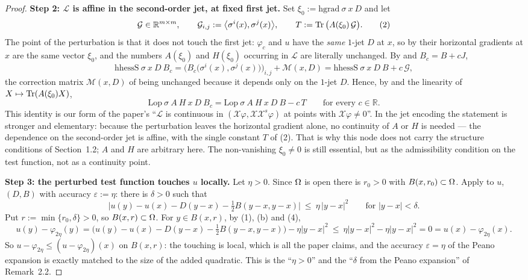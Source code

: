 \begin{proof}
\medskip\noindent\textbf{Step 2: $\mathcal L$ is affine in the second-order jet, at fixed
first jet.} Set $\xi_0:=\mathrm{hgrad}\ \sigma\ x\ D$ and let
\[
 \mathcal G\in\mathbb R^{m\times m},\qquad
 \mathcal G_{i,j}:=\big\langle\sigma^{i}(x),\sigma^{j}(x)\big\rangle,
 \qquad T:=\operatorname{Tr}\big(A(\xi_0)\,\mathcal G\big). \tag{2}
\]
The point of the perturbation is that it does not touch the first jet: $\varphi_c$ and $u$
have the \emph{same} $1$-jet $D$ at $x$, so by  their horizontal gradients
at $x$ are the same vector $\xi_0$, and the numbers $A(\xi_0)$ and $H(\xi_0)$ occurring in
$\mathcal L$ are literally unchanged. By  and $B_c=B+cJ$,
\[
 \mathrm{hhessS}\ \sigma\ x\ D\ B_c
 =\Big(B_c\big(\sigma^{i}(x),\sigma^{j}(x)\big)\Big)_{i,j}+\mathcal M(x,D)
 =\mathrm{hhessS}\ \sigma\ x\ D\ B+c\,\mathcal G ,
\]
the correction matrix $\mathcal M(x,D)$ of  being unchanged because it
depends only on the $1$-jet $D$. Hence, by  and the linearity of
$X\mapsto\operatorname{Tr}(A(\xi_0)X)$,
\[
 \mathrm{Lop}\ \sigma\ A\ H\ x\ D\ B_c
 =\mathrm{Lop}\ \sigma\ A\ H\ x\ D\ B-c\,T\qquad\text{for every }c\in\mathbb R. \tag{3}
\]
This identity is our form of the paper's ``$\mathcal L$ is continuous in
$(\mathcal X\varphi,\mathcal X\mathcal X^{s}\varphi)$ at points with
$\mathcal X\varphi\ne0$''. In the jet encoding the statement is stronger and elementary:
because the perturbation leaves the horizontal gradient alone, no continuity of $A$ or $H$
is needed --- the dependence on the second-order jet is affine, with the single constant
$T$ of (2). That is why this node does not carry the structure conditions
of Section~1.2; $A$ and $H$ are arbitrary here. The non-vanishing
$\xi_0\ne0$ is still essential, but as the admissibility condition on the test function,
not as a continuity point.

\medskip\noindent\textbf{Step 3: the perturbed test function touches $u$ locally.} Let
$\eta>0$. Since $\Omega$ is open there is $r_0>0$ with $B(x,r_0)\subset\Omega$. Apply
 to $u$, $(D,B)$ with accuracy $\varepsilon:=\eta$: there is
$\delta>0$ such that
\[
 \Big|u(y)-u(x)-D(y-x)-\tfrac12B(y-x,y-x)\Big|\ \le\ \eta\,|y-x|^{2}
 \qquad\text{for }|y-x|<\delta. \tag{4}
\]
Put $r:=\min\{r_0,\delta\}>0$, so $B(x,r)\subset\Omega$. For $y\in B(x,r)$, by (1), (b) and
(4),
\[
 u(y)-\varphi_{2\eta}(y)
 =\Big(u(y)-u(x)-D(y-x)-\tfrac12B(y-x,y-x)\Big)-\eta|y-x|^{2}
 \ \le\ \eta|y-x|^{2}-\eta|y-x|^{2}=0
 =u(x)-\varphi_{2\eta}(x).
\]
So $u-\varphi_{2\eta}\le(u-\varphi_{2\eta})(x)$ on $B(x,r)$: the touching is local, which
is all the paper claims, and the accuracy $\varepsilon=\eta$ of the Peano expansion is
exactly matched to the size of the added quadratic. This is the ``$\eta>0$'' and the
``$\delta$ from the Peano expansion'' of Remark~2.2.


\end{proof}
